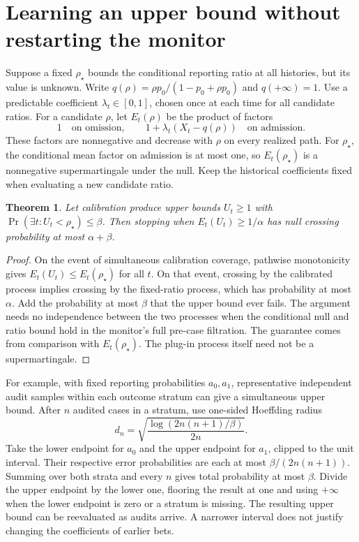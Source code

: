 \documentclass[11pt]{article}
\newtheorem{theorem}{Theorem}
\begin{document}
\section{Learning an upper bound without restarting the monitor}
Suppose a fixed $\rho_\star$ bounds the conditional reporting
ratio at all histories, but its value is unknown. Write
$q(\rho)=\rho p_0/(1-p_0+\rho p_0)$ and $q(+\infty)=1$.
Use a predictable coefficient $\lambda_t\in[0,1]$, chosen
once at each time for all candidate ratios. For a candidate
$\rho$, let $E_t(\rho)$ be the product of factors
\[
 1\quad\text{on omission},\qquad
 1+\lambda_t(X_t-q(\rho))\quad\text{on admission}.
\]
These factors are nonnegative and decrease with $\rho$
on every realized path. For $\rho_\star$, the conditional
mean factor on admission is at most one, so
$E_t(\rho_\star)$ is a nonnegative supermartingale under the
null. Keep the historical coefficients fixed when evaluating a
new candidate ratio.

\begin{theorem}
Let calibration produce upper bounds $U_t\ge1$ with
$\Pr(\exists t:U_t<\rho_\star)\le\beta$. Then stopping when
$E_t(U_t)\ge1/\alpha$ has null crossing probability at most
$\alpha+\beta$.
\end{theorem}
\begin{proof}
On the event of simultaneous calibration coverage, pathwise
monotonicity gives $E_t(U_t)\le E_t(\rho_\star)$ for all $t$.
On that event, crossing by the calibrated process implies
crossing by the fixed-ratio process, which has probability at
most $\alpha$. Add the probability at most $\beta$ that the
upper bound ever fails. The argument needs no independence
between the two processes when the conditional null and
ratio bound hold in the monitor's full pre-case filtration.
The guarantee comes from comparison with $E_t(\rho_\star)$.
The plug-in process itself need not be a supermartingale.
\end{proof}

For example, with fixed reporting probabilities $a_0,a_1$,
representative independent audit samples within each outcome
stratum can give a simultaneous upper bound. After $n$ audited
cases in a stratum, use one-sided Hoeffding radius
\[
 d_n=\sqrt{\frac{\log(2n(n+1)/\beta)}{2n}}.
\]
Take the lower endpoint for $a_0$ and the upper endpoint for
$a_1$, clipped to the unit interval. Their respective error
probabilities are each at most $\beta/(2n(n+1))$. Summing over
both strata and every $n$ gives total probability at most
$\beta$. Divide the upper endpoint by the lower one, flooring
the result at one and using $+\infty$ when the lower endpoint
is zero or a stratum is missing. The resulting upper bound
can be reevaluated as audits arrive. A narrower interval does
not justify changing the coefficients of earlier bets.
\end{document}
